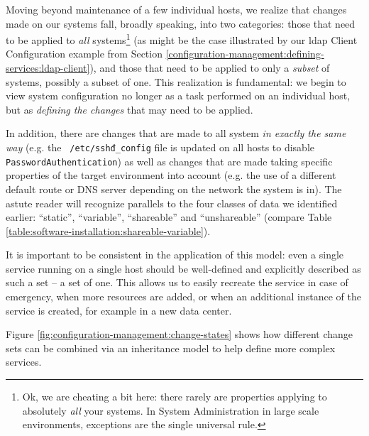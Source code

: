 Moving beyond maintenance of a few individual hosts,
we realize that changes made on our systems fall,
broadly speaking, into two categories: those that need
to be applied to {\em all} systems\footnote{Ok, we
are cheating a bit here: there rarely are properties
applying to absolutely {\em all} your systems.  In
System Administration in large scale environments,
exceptions are the single universal rule.} (as might
be the case illustrated by our \gls{ldap} Client
Configuration example from Section
\ref{configuration-management:defining-services:ldap-client}),
and those that need to be applied to only a {\em
subset} of systems, possibly a subset of one.  This
realization is fundamental: we begin to view system
configuration no longer as a task performed on an
individual host, but as {\em defining the changes}
that may need to be applied.

In addition, there are changes that are made to all
system {\em in exactly the same way} (e.g. the {\tt
/etc/sshđ\_config} file is updated on all hosts to
disable {\tt PasswordAuthentication}) as well as
changes that are made taking specific properties of
the target environment into account (e.g. the use of a
different default route or DNS server depending on the
network the system is in).  The astute reader will
recognize parallels to the four classes of data we
identified earlier: ``static'', ``variable'',
``shareable'' and ``unshareable'' (compare Table
\ref{table:software-installation:shareable-variable}).

It is important to be consistent in the application of
this model:  even a single service running on a single
host should be well-defined and explicitly described
as such a set -- a set of one.  This allows us to
easily recreate the service in case of emergency, when
more resources are added, or when an additional
instance of the service is created, for example in a
new data center.

Figure
\ref{fig:configuration-management:change-states} shows
how different change sets can be combined via an
inheritance model to help define more complex
services.

